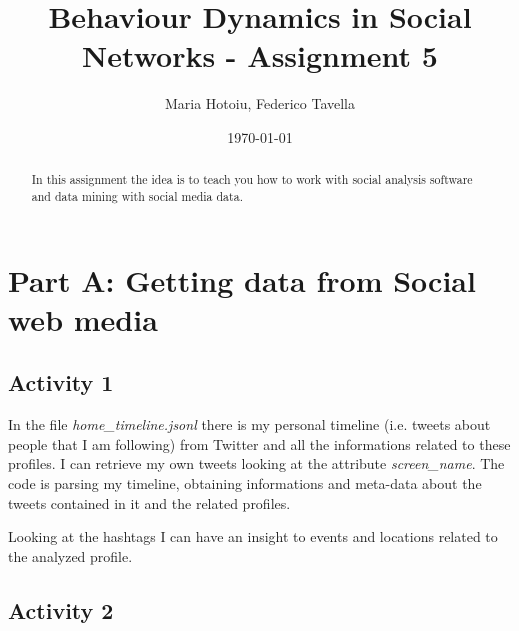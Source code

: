\documentclass[a4paper]{article}
\title{Behaviour Dynamics in Social Networks - Assignment 5}
\author{Maria Hotoiu, Federico Tavella}
\date{\today}
\begin{document}
\maketitle

\begin{abstract}
In this assignment the idea is to teach you how to work with social analysis software and data mining with social media data.
\end{abstract}

\section{Part A: Getting data from Social web media}

\subsection{Activity 1}

In the file \emph{home_timeline.jsonl} there is my personal timeline (i.e. tweets about people that I am following) from Twitter and all the informations related to these profiles. I can retrieve my own tweets looking at the attribute \emph{screen_name}. The code is parsing my timeline, obtaining informations and meta-data about the tweets contained in it and the related profiles.

Looking at the hashtags I can have an insight to events and locations related to the analyzed profile.

\subsection{Activity 2}
\end{document}
